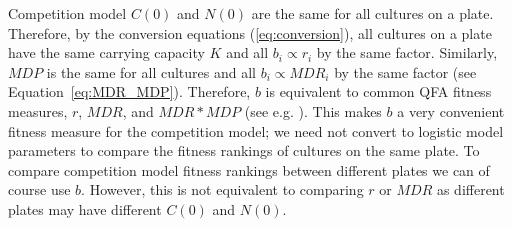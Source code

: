 

Competition model \(C(0)\) and \(N(0)\) are the same for all cultures
on a plate. Therefore, by the conversion equations
(\ref{eq:conversion}), all cultures on a plate have the same carrying
capacity \(K\) and all \(b_{i} \propto r_{i}\) by the same
factor. Similarly, \(MDP\) is the same for all cultures and all
\(b_{i} \propto MDR_{i}\) by the same factor (see
Equation~\ref{eq:MDR_MDP}). Therefore, \(b\) is equivalent to common
QFA fitness measures, \(r\), \(MDR\), and \(MDR*MDP\) (see
e.g. \citet{Addinall2011}). This makes \(b\) a very convenient fitness
measure for the competition model; we need not convert to logistic
model parameters to compare the fitness rankings of cultures on the
same plate. To compare competition model fitness rankings between
different plates we can of course use \(b\). However, this is not
equivalent to comparing \(r\) or \(MDR\) as different plates may have
different \(C(0)\) and \(N(0)\).

